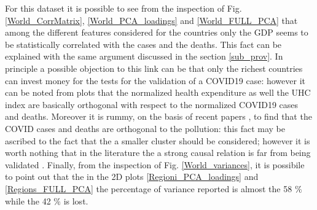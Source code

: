 \documentclass[
12pt, %
a4paper, %
oneside, %
headinclude,footinclude, %
BCOR5mm, %
]{scrartcl}
\begin{document}
For this dataset it is possible to see from the inspection of Fig. \ref{World_CorrMatrix}, \ref{World_PCA_loadings} and \ref{World_FULL_PCA} that among the different features considered for the countries only the GDP seems to be statistically correlated with the cases and the deaths. This fact can be explained with the same argument discussed in the section \ref{sub_prov}. In principle a possible objection to this link can be that only the richest countries can invest money for the tests for the validation of a COVID19 case: however it can be noted from plots that the normalized health expenditure as well the UHC index are basically orthogonal with respect to the normalized COVID19 cases and deaths. Moreover it is rummy, on the basis of recent papers , to find that the COVID cases and deaths are orthogonal to the pollution: this fact may be ascribed to the fact that the a smaller cluster should be considered; however it is worth nothing that in the literature the a strong causal relation is far from being validated \cite{contini2020does}. Finally, from the inspection of Fig. \ref{World_variances}, it is possibile to point out that the in the 2D plots \ref{Regioni_PCA_loadings} and \ref{Regions_FULL_PCA} the percentage of variance reported is almost the 58 $ \% $ while the 42 $ \% $ is lost.
\end{document}
